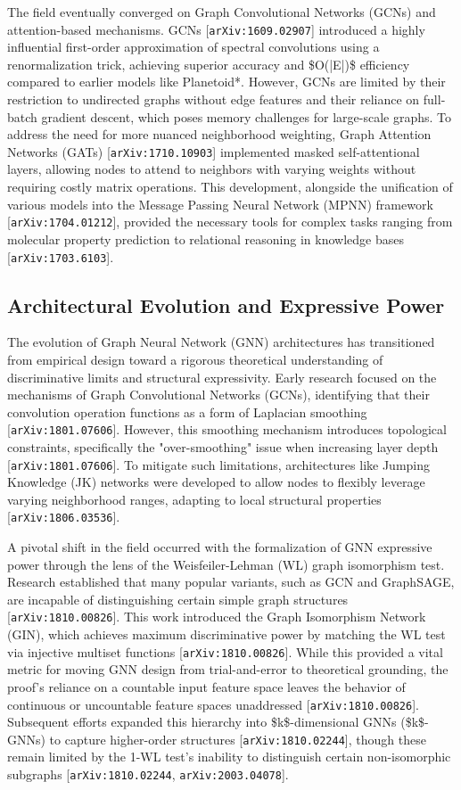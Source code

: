 \documentclass[11pt]{article}
\begin{document}
The field eventually converged on Graph Convolutional Networks (GCNs) and attention-based mechanisms. GCNs [\texttt{arXiv:1609.02907}] introduced a highly influential first-order approximation of spectral convolutions using a renormalization trick, achieving superior accuracy and \$O(|E|)\$ efficiency compared to earlier models like Planetoid*. However, GCNs are limited by their restriction to undirected graphs without edge features and their reliance on full-batch gradient descent, which poses memory challenges for large-scale graphs. To address the need for more nuanced neighborhood weighting, Graph Attention Networks (GATs) [\texttt{arXiv:1710.10903}] implemented masked self-attentional layers, allowing nodes to attend to neighbors with varying weights without requiring costly matrix operations. This development, alongside the unification of various models into the Message Passing Neural Network (MPNN) framework [\texttt{arXiv:1704.01212}], provided the necessary tools for complex tasks ranging from molecular property prediction to relational reasoning in knowledge bases [\texttt{arXiv:1703.6103}].

\subsection{Architectural Evolution and Expressive Power}

The evolution of Graph Neural Network (GNN) architectures has transitioned from empirical design toward a rigorous theoretical understanding of discriminative limits and structural expressivity. Early research focused on the mechanisms of Graph Convolutional Networks (GCNs), identifying that their convolution operation functions as a form of Laplacian smoothing [\texttt{arXiv:1801.07606}]. However, this smoothing mechanism introduces topological constraints, specifically the "over-smoothing" issue when increasing layer depth [\texttt{arXiv:1801.07606}]. To mitigate such limitations, architectures like Jumping Knowledge (JK) networks were developed to allow nodes to flexibly leverage varying neighborhood ranges, adapting to local structural properties [\texttt{arXiv:1806.03536}].

A pivotal shift in the field occurred with the formalization of GNN expressive power through the lens of the Weisfeiler-Lehman (WL) graph isomorphism test. Research established that many popular variants, such as GCN and GraphSAGE, are incapable of distinguishing certain simple graph structures [\texttt{arXiv:1810.00826}]. This work introduced the Graph Isomorphism Network (GIN), which achieves maximum discriminative power by matching the WL test via injective multiset functions [\texttt{arXiv:1810.00826}]. While this provided a vital metric for moving GNN design from trial-and-error to theoretical grounding, the proof's reliance on a countable input feature space leaves the behavior of continuous or uncountable feature spaces unaddressed [\texttt{arXiv:1810.00826}]. Subsequent efforts expanded this hierarchy into \$k\$-dimensional GNNs (\$k\$-GNNs) to capture higher-order structures [\texttt{arXiv:1810.02244}], though these remain limited by the 1-WL test's inability to distinguish certain non-isomorphic subgraphs [\texttt{arXiv:1810.02244}, \texttt{arXiv:2003.04078}].
\end{document}
